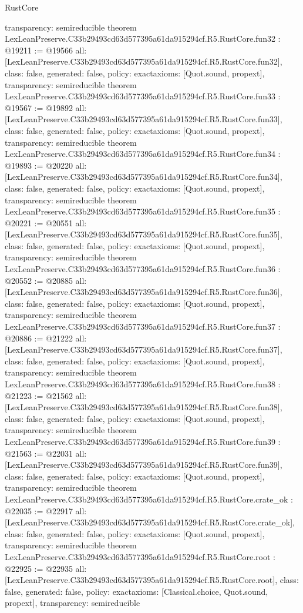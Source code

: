 \begin{lexlean}{RustCore}
\begin{coremodule}
{  transparency: semireducible
}
theorem LexLeanPreserve.C33b29493cd63d577395a61da915294cf.R5.RustCore.fun32 : @19211 := @19566 {
  all: [LexLeanPreserve.C33b29493cd63d577395a61da915294cf.R5.RustCore.fun32],
  class: false,
  generated: false,
  policy: exact{axioms: [Quot.sound, propext]},
  transparency: semireducible
}
theorem LexLeanPreserve.C33b29493cd63d577395a61da915294cf.R5.RustCore.fun33 : @19567 := @19892 {
  all: [LexLeanPreserve.C33b29493cd63d577395a61da915294cf.R5.RustCore.fun33],
  class: false,
  generated: false,
  policy: exact{axioms: [Quot.sound, propext]},
  transparency: semireducible
}
theorem LexLeanPreserve.C33b29493cd63d577395a61da915294cf.R5.RustCore.fun34 : @19893 := @20220 {
  all: [LexLeanPreserve.C33b29493cd63d577395a61da915294cf.R5.RustCore.fun34],
  class: false,
  generated: false,
  policy: exact{axioms: [Quot.sound, propext]},
  transparency: semireducible
}
theorem LexLeanPreserve.C33b29493cd63d577395a61da915294cf.R5.RustCore.fun35 : @20221 := @20551 {
  all: [LexLeanPreserve.C33b29493cd63d577395a61da915294cf.R5.RustCore.fun35],
  class: false,
  generated: false,
  policy: exact{axioms: [Quot.sound, propext]},
  transparency: semireducible
}
theorem LexLeanPreserve.C33b29493cd63d577395a61da915294cf.R5.RustCore.fun36 : @20552 := @20885 {
  all: [LexLeanPreserve.C33b29493cd63d577395a61da915294cf.R5.RustCore.fun36],
  class: false,
  generated: false,
  policy: exact{axioms: [Quot.sound, propext]},
  transparency: semireducible
}
theorem LexLeanPreserve.C33b29493cd63d577395a61da915294cf.R5.RustCore.fun37 : @20886 := @21222 {
  all: [LexLeanPreserve.C33b29493cd63d577395a61da915294cf.R5.RustCore.fun37],
  class: false,
  generated: false,
  policy: exact{axioms: [Quot.sound, propext]},
  transparency: semireducible
}
theorem LexLeanPreserve.C33b29493cd63d577395a61da915294cf.R5.RustCore.fun38 : @21223 := @21562 {
  all: [LexLeanPreserve.C33b29493cd63d577395a61da915294cf.R5.RustCore.fun38],
  class: false,
  generated: false,
  policy: exact{axioms: [Quot.sound, propext]},
  transparency: semireducible
}
theorem LexLeanPreserve.C33b29493cd63d577395a61da915294cf.R5.RustCore.fun39 : @21563 := @22031 {
  all: [LexLeanPreserve.C33b29493cd63d577395a61da915294cf.R5.RustCore.fun39],
  class: false,
  generated: false,
  policy: exact{axioms: [Quot.sound, propext]},
  transparency: semireducible
}
theorem LexLeanPreserve.C33b29493cd63d577395a61da915294cf.R5.RustCore.crate_ok : @22035 := @22917 {
  all: [LexLeanPreserve.C33b29493cd63d577395a61da915294cf.R5.RustCore.crate_ok],
  class: false,
  generated: false,
  policy: exact{axioms: [Quot.sound, propext]},
  transparency: semireducible
}
theorem LexLeanPreserve.C33b29493cd63d577395a61da915294cf.R5.RustCore.root : @22925 := @22935 {
  all: [LexLeanPreserve.C33b29493cd63d577395a61da915294cf.R5.RustCore.root],
  class: false,
  generated: false,
  policy: exact{axioms: [Classical.choice, Quot.sound, propext]},
  transparency: semireducible
}


\end{coremodule}
\end{lexlean}
